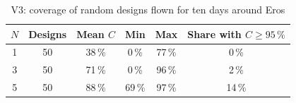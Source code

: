 \begin{table}[htbp]
\centering
\caption{V3: coverage of random designs flown for ten days around Eros}
\label{tab:v3}
\footnotesize
\begin{tabular}{@{}cccccc@{}}
\toprule
$N$ & Designs & Mean $C$ & Min & Max & Share with $C\ge95\,\%$ \\
\midrule
1 & 50 & 38\,\% & 0\,\% & 77\,\% & 0\,\% \\
3 & 50 & 71\,\% & 0\,\% & 96\,\% & 2\,\% \\
5 & 50 & 88\,\% & 69\,\% & 97\,\% & 14\,\% \\
\bottomrule
\end{tabular}
\end{table}
